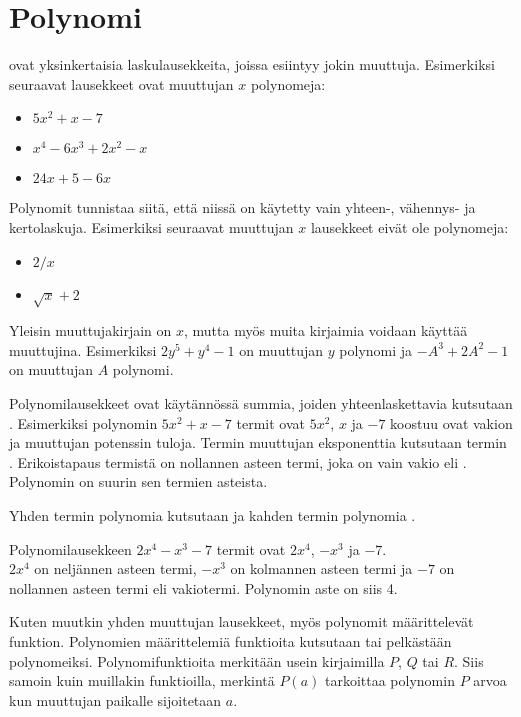 \chapter{Polynomi}

 ovat yksinkertaisia laskulausekkeita, joissa esiintyy jokin muuttuja.
Esimerkiksi seuraavat lausekkeet ovat muuttujan $x$ polynomeja:
\begin{itemize}
\item $5x^2+x-7$
\item $x^4-6x^3+2x^2-x$
\item $24x+5-6x$
\end{itemize}
Polynomit tunnistaa siitä, että niissä on käytetty vain yhteen-, vähennys- ja kertolaskuja.
Esimerkiksi seuraavat muuttujan $x$ lausekkeet eivät ole polynomeja:
\begin{itemize}
\item $2/x$
\item $\sqrt{x}+2$
\end{itemize}
Yleisin muuttujakirjain on $x$, mutta myös muita kirjaimia voidaan käyttää
muuttujina. Esimerkiksi $2y^5+y^4-1$ on muuttujan $y$ polynomi ja
$-A^3+2A^2-1$ on muuttujan $A$ polynomi.

Polynomilausekkeet ovat käytännössä summia, joiden yhteenlaskettavia kutsutaan .
Esimerkiksi polynomin $5x^2+x-7$ termit ovat $5x^2$, $x$ ja $-7$ koostuu 
  ovat vakion ja muuttujan potenssin tuloja.
Termin muuttujan
eksponenttia kutsutaan termin . Erikoistapaus termistä on
nollannen asteen termi, joka on vain vakio eli . Polynomin
 on suurin sen termien asteista.

Yhden termin polynomia kutsutaan  ja kahden termin polynomia
.

\begin{esimerkki}
Polynomilausekkeen $2x^4-x^3-7$ termit ovat $2x^4$, $-x^3$ ja $-7$. \\
$2x^4$ on neljännen asteen termi, $-x^3$ on kolmannen asteen termi ja $-7$ on nollannen
asteen termi eli vakiotermi. Polynomin aste on siis 4.

\end{esimerkki}

Kuten muutkin yhden muuttujan lausekkeet, myös polynomit määrittelevät
funktion. Polynomien määrittelemiä funktioita kutsutaan
 tai pelkästään polynomeiksi. Polynomifunktioita
merkitään usein kirjaimilla $P$, $Q$ tai $R$. Siis samoin kuin muillakin
funktioilla, merkintä $P(a)$ tarkoittaa polynomin $P$ arvoa kun muuttujan
paikalle sijoitetaan $a$.

